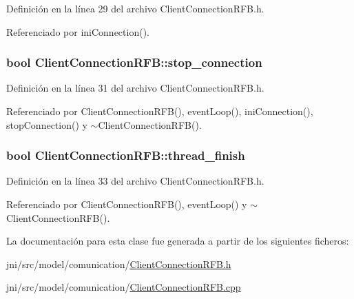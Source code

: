 Definición en la línea 29 del archivo Client\-Connection\-R\-F\-B.\-h.



Referenciado por ini\-Connection().

\hypertarget{classClientConnectionRFB_a6abf99187b5b7f796903e60537bad442}{
\subsubsection[{stop\-\_\-connection}]{\setlength{\rightskip}{0pt plus 5cm}bool Client\-Connection\-R\-F\-B\-::stop\-\_\-connection\hspace{0.3cm}{\ttfamily [private]}}}\label{classClientConnectionRFB_a6abf99187b5b7f796903e60537bad442}


Definición en la línea 31 del archivo Client\-Connection\-R\-F\-B.\-h.



Referenciado por Client\-Connection\-R\-F\-B(), event\-Loop(), ini\-Connection(), stop\-Connection() y $\sim$\-Client\-Connection\-R\-F\-B().

\hypertarget{classClientConnectionRFB_abed37570b0fcc1acfae40cfca845c332}{
\subsubsection[{thread\-\_\-finish}]{\setlength{\rightskip}{0pt plus 5cm}bool Client\-Connection\-R\-F\-B\-::thread\-\_\-finish\hspace{0.3cm}{\ttfamily [private]}}}\label{classClientConnectionRFB_abed37570b0fcc1acfae40cfca845c332}


Definición en la línea 33 del archivo Client\-Connection\-R\-F\-B.\-h.



Referenciado por Client\-Connection\-R\-F\-B(), event\-Loop() y $\sim$\-Client\-Connection\-R\-F\-B().



La documentación para esta clase fue generada a partir de los siguientes ficheros\-:\begin{DoxyCompactItemize}
\item 
jni/src/model/comunication/\hyperlink{ClientConnectionRFB_8h}{Client\-Connection\-R\-F\-B.\-h}\item 
jni/src/model/comunication/\hyperlink{ClientConnectionRFB_8cpp}{Client\-Connection\-R\-F\-B.\-cpp}\end{DoxyCompactItemize}
